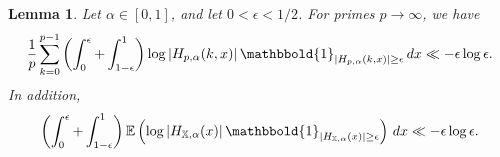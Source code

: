 \documentclass[reqno]{amsart}
\newtheorem{lemma}[theorem]{Lemma}
\numberwithin{equation}{section}
\numberwithin{table}{section}
\numberwithin{figure}{section}
\newcommand{\abs}[1]{\left\lvert#1\right\rvert}
\begin{document}
\begin{lemma}\label{lemLargeValsAtEndsInt}
Let $\alpha\in[0,1]$, and let $0<\epsilon<1/2$.
For primes $p\to\infty$, we have
\begin{equation}\label{eqnLargeH}
\frac{1}{p} \sum_{k=0}^{p-1} \left(\int_0^\epsilon + \int_{1-\epsilon}^1\right) \log\abs{H_{p,\alpha}(k,x)} \mathbbold{1}_{\abs{H_{p,\alpha}(k,x)}\geq\epsilon}\,dx \ll -\epsilon \log \epsilon.
\end{equation}
In addition, 
\begin{equation*}
\left(\int_0^\epsilon + \int_{1-\epsilon}^1\right) \mathbb{E}\left(\log\abs{H_{\mathbb{X},\alpha}(x)} \mathbbold{1}_{\abs{H_{\mathbb{X},\alpha}(x)}\geq\epsilon}\right)\,dx \ll -\epsilon \log \epsilon.
\end{equation*}
\end{lemma}
\end{document}
